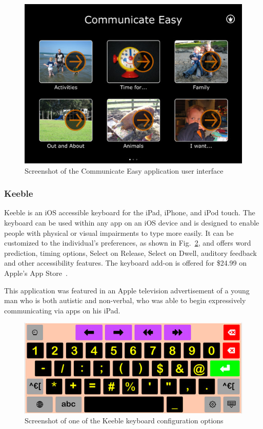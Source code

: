 \begin{figure}[!htb]
\centering
\includegraphics[width=.7\textwidth]{communicateEasy.jpg}
\caption{\label{fig:communicateEasy}Screenshot of the Communicate Easy application user interface}
\end{figure}

\subsubsection{Keeble}
Keeble is an iOS accessible keyboard for the iPad, iPhone, and iPod touch. The keyboard can be used within any app on an iOS device and is designed to enable people with physical or visual impairments to type more easily. It can be customized to the individual's preferences, as shown in Fig.~\ref{fig:keeble}, and offers word prediction, timing options, Select on Release, Select on Dwell, auditory feedback and other accessibility features. The keyboard add-on is  offered for \$24.99 on Apple's App Store~\cite{keeble}.

This application was featured in an Apple television advertisement of a young man who is both autistic and non-verbal, who was able to begin expressively communicating via apps on his iPad.

\begin{figure}[!htb]
\centering
\includegraphics[width=1\textwidth]{keeble.png}
\caption{\label{fig:keeble}Screenshot of one of the Keeble keyboard configuration options}
\end{figure}

